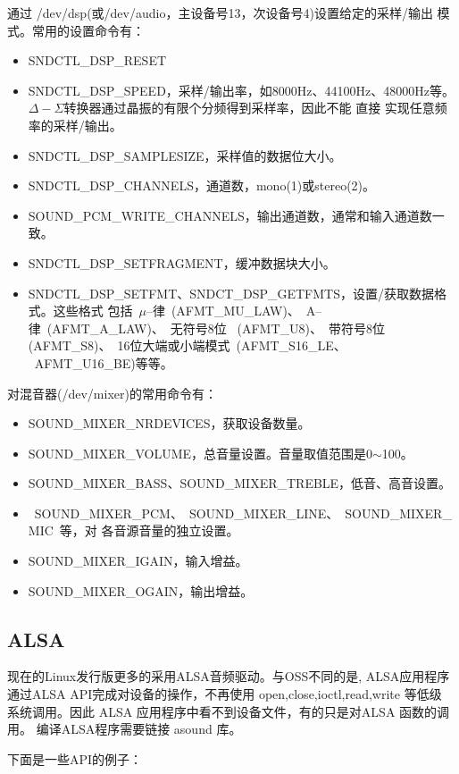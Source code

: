 	通过 /dev/dsp(或/dev/audio，主设备号13，次设备号4)设置给定的采样/输出
模式。常用的设置命令有：
\begin{itemize}\itemsep=-3pt
  \item SNDCTL\_DSP\_RESET
  \item SNDCTL\_DSP\_SPEED，采样/输出率，如8000Hz、44100Hz、48000Hz等。
		$\Delta-\Sigma$转换器通过晶振的有限个分频得到采样率，因此不能 直接
        实现任意频率的采样/输出。
  \item SNDCTL\_DSP\_SAMPLESIZE，采样值的数据位大小。
  \item SNDCTL\_DSP\_CHANNELS，通道数，mono(1)或stereo(2)。
  \item SOUND\_PCM\_WRITE\_CHANNELS，输出通道数，通常和输入通道数一致。
  \item SNDCTL\_DSP\_SETFRAGMENT，缓冲数据块大小。
  \item SNDCTL\_DSP\_SETFMT、SNDCT\_DSP\_GETFMTS，设置/获取数据格式。这些格式
		包括~$\mu$--律~(AFMT\_MU\_LAW)、~A--律~(AFMT\_A\_LAW)、~无符号8位~
		(AFMT\_U8)、~带符号8位(AFMT\_S8)、~16位大端或小端模式~(AFMT\_S16\_LE、
		~AFMT\_U16\_BE)等等。
\end{itemize}

	对混音器(/dev/mixer)的常用命令有：
\begin{itemize}\itemsep=-3pt
  \item SOUND\_MIXER\_NRDEVICES，获取设备数量。
  \item SOUND\_MIXER\_VOLUME，总音量设置。音量取值范围是0$\sim$100。
  \item SOUND\_MIXER\_BASS、SOUND\_MIXER\_TREBLE，低音、高音设置。
  \item ~SOUND\_MIXER\_PCM、~SOUND\_MIXER\_LINE、~SOUND\_MIXER\_MIC~等，对
		各音源音量的独立设置。 
  \item SOUND\_MIXER\_IGAIN，输入增益。
  \item SOUND\_MIXER\_OGAIN，输出增益。
\end{itemize}

\subsection{ALSA}
	现在的Linux发行版更多的采用ALSA音频驱动。与OSS不同的是, ALSA应用程序
通过ALSA API完成对设备的操作，不再使用 open,close,ioctl,read,write 等低级
系统调用。因此 ALSA 应用程序中看不到设备文件，有的只是对ALSA 函数的调用。
编译ALSA程序需要链接 asound 库。

	下面是一些API的例子：

